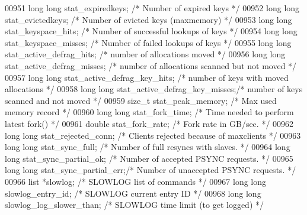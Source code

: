 \begin{DoxyCode}
{{{{{{00951     \textcolor{keywordtype}{long} \textcolor{keywordtype}{long} stat\_expiredkeys;     \textcolor{comment}{/* Number of expired keys */}
00952     \textcolor{keywordtype}{long} \textcolor{keywordtype}{long} stat\_evictedkeys;     \textcolor{comment}{/* Number of evicted keys (maxmemory) */}
00953     \textcolor{keywordtype}{long} \textcolor{keywordtype}{long} stat\_keyspace\_hits;   \textcolor{comment}{/* Number of successful lookups of keys */}
00954     \textcolor{keywordtype}{long} \textcolor{keywordtype}{long} stat\_keyspace\_misses; \textcolor{comment}{/* Number of failed lookups of keys */}
00955     \textcolor{keywordtype}{long} \textcolor{keywordtype}{long} stat\_active\_defrag\_hits;      \textcolor{comment}{/* number of allocations moved */}
00956     \textcolor{keywordtype}{long} \textcolor{keywordtype}{long} stat\_active\_defrag\_misses;    \textcolor{comment}{/* number of allocations scanned but not moved */}
00957     \textcolor{keywordtype}{long} \textcolor{keywordtype}{long} stat\_active\_defrag\_key\_hits;  \textcolor{comment}{/* number of keys with moved allocations */}
00958     \textcolor{keywordtype}{long} \textcolor{keywordtype}{long} stat\_active\_defrag\_key\_misses;\textcolor{comment}{/* number of keys scanned and not moved */}
00959     size\_t stat\_peak\_memory;        \textcolor{comment}{/* Max used memory record */}
00960     \textcolor{keywordtype}{long} \textcolor{keywordtype}{long} stat\_fork\_time;       \textcolor{comment}{/* Time needed to perform latest fork() */}
00961     \textcolor{keywordtype}{double} stat\_fork\_rate;          \textcolor{comment}{/* Fork rate in GB/sec. */}
00962     \textcolor{keywordtype}{long} \textcolor{keywordtype}{long} stat\_rejected\_conn;   \textcolor{comment}{/* Clients rejected because of maxclients */}
00963     \textcolor{keywordtype}{long} \textcolor{keywordtype}{long} stat\_sync\_full;       \textcolor{comment}{/* Number of full resyncs with slaves. */}
00964     \textcolor{keywordtype}{long} \textcolor{keywordtype}{long} stat\_sync\_partial\_ok; \textcolor{comment}{/* Number of accepted PSYNC requests. */}
00965     \textcolor{keywordtype}{long} \textcolor{keywordtype}{long} stat\_sync\_partial\_err;\textcolor{comment}{/* Number of unaccepted PSYNC requests. */}
00966     list *slowlog;                  \textcolor{comment}{/* SLOWLOG list of commands */}
00967     \textcolor{keywordtype}{long} \textcolor{keywordtype}{long} slowlog\_entry\_id;     \textcolor{comment}{/* SLOWLOG current entry ID */}
00968     \textcolor{keywordtype}{long} \textcolor{keywordtype}{long} slowlog\_log\_slower\_than; \textcolor{comment}{/* SLOWLOG time limit (to get logged) */}
}}}}}}
\end{DoxyCode}
